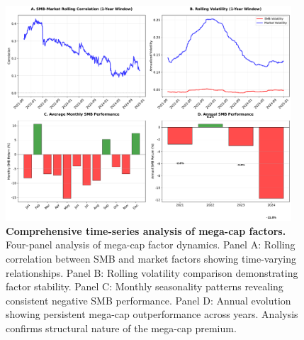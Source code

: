 \documentclass[10pt,letterpaper]{article}
\begin{document}
\begin{figure}[!h]
\centering
\includegraphics[width=0.95\textwidth]{figures/fig_enhanced_timeseries_analysis.pdf}
\caption{\textbf{Comprehensive time-series analysis of mega-cap factors.}
Four-panel analysis of mega-cap factor dynamics. Panel A: Rolling correlation between SMB and market factors showing time-varying relationships. Panel B: Rolling volatility comparison demonstrating factor stability. Panel C: Monthly seasonality patterns revealing consistent negative SMB performance. Panel D: Annual evolution showing persistent mega-cap outperformance across years. Analysis confirms structural nature of the mega-cap premium.}
\label{fig:timeseries_analysis}
\end{figure}
\end{document}
